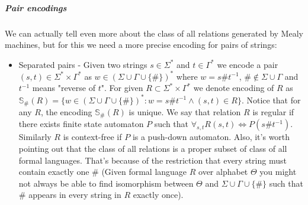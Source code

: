 \documentclass[12pt]{article}
\begin{document}
\subparagraph{Pair encodings} We can actually tell even more about the class of all relations generated by Mealy machines, but for this we need a more precise encoding for pairs of strings:
\begin{itemize}
	\item Separated pairs - Given two strings $s \in \Sigma^*$ and $t \in \Gamma^*$ we encode a pair $(s,t) \in \Sigma^* \times \Gamma^*$ as $w \in (\Sigma \cup \Gamma \cup \{\#\})^*$ where $w=s\#t^{-1}$,  $\# \notin \Sigma \cup \Gamma$ and $t^{-1}$ means "reverse of $t$". For given $R \subset \Sigma^* \times \Gamma^*$ we denote encoding of $R$ as $\mathbb{S}_\#(R) = \{w\in (\Sigma \cup \Gamma \cup \{\#\})^*: w=s\#t^{-1} \wedge (s,t) \in R \}$. Notice that for any $R$, the encoding $\mathbb{S}_\#(R)$ is unique. We say that relation $R$ is regular if there exists finite state automaton $P$ such that  $\forall_{s,t} R(s,t) \iff P(s\#t^{-1})$. Similarly $R$ is context-free if $P$ is a push-down automaton. Also, it's worth pointing out that the class of all relations is a proper subset of class of all formal languages. That's because of the restriction that every string must contain exactly one $\#$ (Given formal language $R$ over alphabet $\Theta$ you might not always be able to find isomorphism between $\Theta$ and $\Sigma \cup \Gamma \cup \{\#\}$ such that $\#$ appears in every string in $R$ exactly once).
	

\end{itemize}
\end{document}
